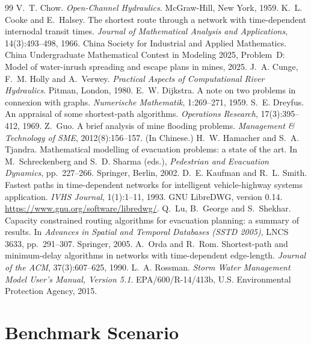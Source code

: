 \documentclass[11pt,a4paper]{article}
\theoremstyle{plain}
\theoremstyle{definition}
\theoremstyle{remark}
\begin{document}
\begin{thebibliography}{99}
\setlength{\itemsep}{2pt}\small
{} V.~T. Chow. \emph{Open-Channel Hydraulics}. McGraw-Hill, New York, 1959.
 K.~L. Cooke and E.~Halsey. The shortest route through a network with time-dependent internodal transit times. \emph{Journal of Mathematical Analysis and Applications}, 14(3):493--498, 1966.
 China Society for Industrial and Applied Mathematics. China Undergraduate Mathematical Contest in Modeling 2025, Problem~D: Model of water-inrush spreading and escape plans in mines, 2025.
 J.~A. Cunge, F.~M. Holly and A.~Verwey. \emph{Practical Aspects of Computational River Hydraulics}. Pitman, London, 1980.
 E.~W. Dijkstra. A note on two problems in connexion with graphs. \emph{Numerische Mathematik}, 1:269--271, 1959.
 S.~E. Dreyfus. An appraisal of some shortest-path algorithms. \emph{Operations Research}, 17(3):395--412, 1969.
 Z.~Guo. A brief analysis of mine flooding problems. \emph{Management \& Technology of SME}, 2012(8):156--157. (In Chinese.)
 H.~W. Hamacher and S.~A. Tjandra. Mathematical modelling of evacuation problems: a state of the art. In M.~Schreckenberg and S.~D. Sharma (eds.), \emph{Pedestrian and Evacuation Dynamics}, pp.~227--266. Springer, Berlin, 2002.
 D.~E. Kaufman and R.~L. Smith. Fastest paths in time-dependent networks for intelligent vehicle-highway systems application. \emph{IVHS Journal}, 1(1):1--11, 1993.
 GNU LibreDWG, version 0.14. \url{https://www.gnu.org/software/libredwg/}.
 Q.~Lu, B.~George and S.~Shekhar. Capacity constrained routing algorithms for evacuation planning: a summary of results. In \emph{Advances in Spatial and Temporal Databases (SSTD 2005)}, LNCS 3633, pp.~291--307. Springer, 2005.
 A.~Orda and R.~Rom. Shortest-path and minimum-delay algorithms in networks with time-dependent edge-length. \emph{Journal of the ACM}, 37(3):607--625, 1990.
 L.~A. Rossman. \emph{Storm Water Management Model User's Manual, Version 5.1}. EPA/600/R-14/413b, U.S. Environmental Protection Agency, 2015.
\end{thebibliography}

\appendix
\section{Benchmark Scenario}\label{app:coords}
\end{document}
